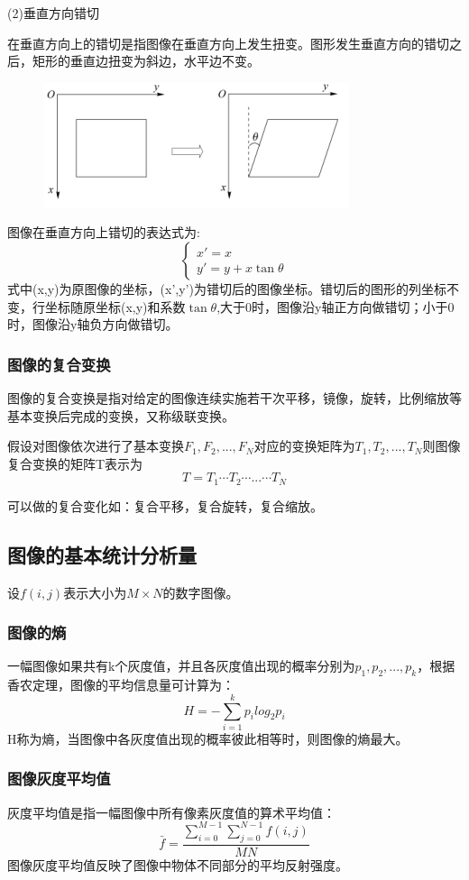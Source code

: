\documentclass[11pt]{article}
\begin{document}
(2)垂直方向错切

在垂直方向上的错切是指图像在垂直方向上发生扭变。图形发生垂直方向的错切之后，矩形的垂直边扭变为斜边，水平边不变。

\begin{figure}[H]
	\centering
	\includegraphics[scale=0.5]{21}
\end{figure}

图像在垂直方向上错切的表达式为:
$$\left\{\begin{matrix}
	x'=x\\ 
	y'=y + x\tan\theta
\end{matrix}\right.$$
式中(x,y)为原图像的坐标，(x',y')为错切后的图像坐标。错切后的图形的列坐标不变，行坐标随原坐标(x,y)和系数$\tan\theta$,大于0时，图像沿y轴正方向做错切；小于0时，图像沿y轴负方向做错切。
\subsubsection{图像的复合变换}
图像的复合变换是指对给定的图像连续实施若干次平移，镜像，旋转，比例缩放等基本变换后完成的变换，又称级联变换。

假设对图像依次进行了基本变换$F_1,F_2,...,F_N$对应的变换矩阵为$T_1,T_2,...,T_N$则图像复合变换的矩阵T表示为
$$T = T_1\cdots T_2\cdots ... \cdots T_N$$

可以做的复合变化如：复合平移，复合旋转，复合缩放。



\subsection{图像的基本统计分析量}
设$f(i,j)$表示大小为$M\times N$的数字图像。
\subsubsection{图像的熵}
一幅图像如果共有k个灰度值，并且各灰度值出现的概率分别为$p_1,p_2,...,p_k$，根据香农定理，图像的平均信息量可计算为：
$$H = -\sum_{i=1}^{k}p_ilog_2p_i$$
H称为熵，当图像中各灰度值出现的概率彼此相等时，则图像的熵最大。
\subsubsection{图像灰度平均值}
灰度平均值是指一幅图像中所有像素灰度值的算术平均值：
$$\bar{f} = \frac{\sum_{i=0}^{M-1}\sum_{j=0}^{N-1}f(i,j)}{MN}$$
图像灰度平均值反映了图像中物体不同部分的平均反射强度。
\end{document}
